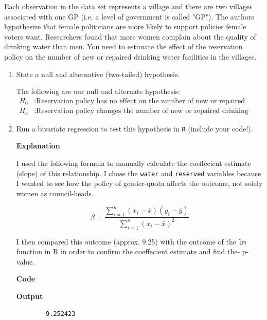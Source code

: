\documentclass[12pt,letterpaper]{article}
\begin{document}
\noindent Each observation in the data set represents a village and there are two villages associated with one GP (i.e. a level of government is called "GP"). The authors hypothesize that female politicians are more likely to support policies female voters want. Researchers found that more women complain about the quality of drinking water than men. You need to estimate the effect of the reservation policy on the number of new or repaired drinking water facilities in the villages.
\vspace{.5cm}


\newpage
\begin{enumerate}
	\item [(a)] State a null and alternative (two-tailed) hypothesis. 
	\vspace{.5cm}

	The following are our null and alternate hypothesis:
	\begin{align*}
	H_0 &: \text{Reservation policy has no effect on the number of new or repaired drinking water facilities.} \\
	H_a &: \text{Reservation policy changes the number of new or repaired drinking water facilities.}
	\end{align*}

	\vspace{2cm}
	\item [(b)] Run a bivariate regression to test this hypothesis in \texttt{R} (include your code!).
	\vspace{.5cm}
		
	\textbf{Explanation}
	\vspace{.5cm}

	I used the following formula to manually calculate the coeffecient estimate (slope) of this relationship. I chose the \texttt{water} and \texttt{reserved} variables because I wanted to see how the policy of gender-quota affects the outcome, not solely women as council-heads.

	\[
	{\beta} = \frac{\sum_{i=1}^{n}(x_i - \bar{x})(y_i - \bar{y})}{\sum_{i=1}^{n}(x_i - \bar{x})^2}
	\]
	\vspace{.5cm}
	
	I then compared this outcome (approx. 9.25) with the outcome of the \texttt{lm} function in R in order to confirm the coeffecient estimate and find the- p-value.
	
	\vspace{.5cm}

	\textbf{Code}
    
	\vspace{1cm}
    \textbf{Output}
	\begin{verbatim}
        9.252423


\end{verbatim}
\end{enumerate}
\end{document}
